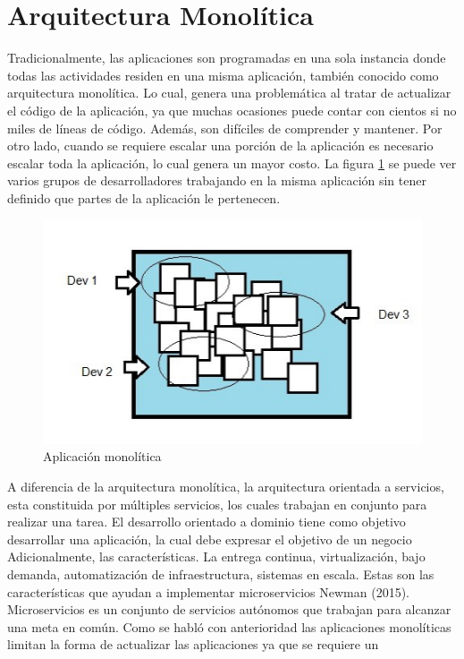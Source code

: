 \documentclass[12pt,twoside]{reedthesis}
\theoremstyle{definition}
\theoremstyle{definition}
\theoremstyle{definition}
\theoremstyle{remark}
\begin{document}
\hypertarget{arquitectura-monolitica}{%
\section{Arquitectura Monolítica}\label{arquitectura-monolitica}}

Tradicionalmente, las aplicaciones son programadas en una sola instancia
donde todas las actividades residen en una misma aplicación, también
conocido como arquitectura monolítica. Lo cual, genera una problemática
al tratar de actualizar el código de la aplicación, ya que muchas
ocasiones puede contar con cientos si no miles de líneas de código.
Además, son difíciles de comprender y mantener. Por otro lado, cuando se
requiere escalar una porción de la aplicación es necesario escalar toda
la aplicación, lo cual genera un mayor costo. La figura \ref{figura1} se
puede ver varios grupos de desarrolladores trabajando en la misma
aplicación sin tener definido que partes de la aplicación le pertenecen.
\begin{figure}[h!]
  \centering
  \includegraphics[scale=0.5]{./figure/Cap3/monoFig1.png}
  \caption{Aplicación monolítica}\label{figura1}
\end{figure}
A diferencia de la arquitectura monolítica, la arquitectura orientada a
servicios, esta constituida por múltiples servicios, los cuales trabajan
en conjunto para realizar una tarea. El desarrollo orientado a dominio
tiene como objetivo desarrollar una aplicación, la cual debe expresar el
objetivo de un negocio Adicionalmente, las características. La entrega
continua, virtualización, bajo demanda, automatización de
infraestructura, sistemas en escala. Estas son las características que
ayudan a implementar microservicios Newman (2015). Microservicios es un
conjunto de servicios autónomos que trabajan para alcanzar una meta en
común. Como se habló con anterioridad las aplicaciones monolíticas
limitan la forma de actualizar las aplicaciones ya que se requiere un
\end{document}
